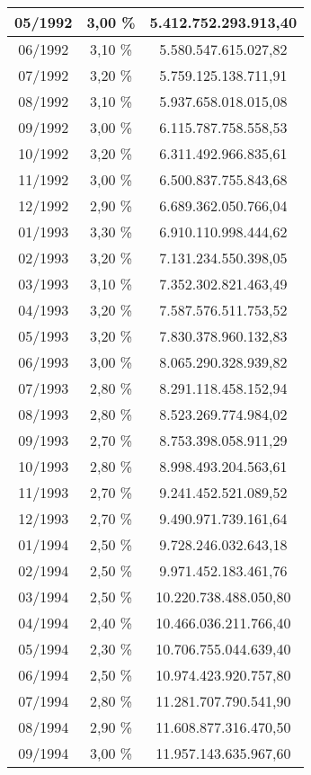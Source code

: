 \begin{center}
\begin{longtable}{|c|c|c|}
05/1992 & 3,00 \% & 5.412.752.293.913,40 \\ \hline
06/1992 & 3,10 \% & 5.580.547.615.027,82 \\ \hline
07/1992 & 3,20 \% & 5.759.125.138.711,91 \\ \hline
08/1992 & 3,10 \% & 5.937.658.018.015,08 \\ \hline
09/1992 & 3,00 \% & 6.115.787.758.558,53 \\ \hline
10/1992 & 3,20 \% & 6.311.492.966.835,61 \\ \hline
11/1992 & 3,00 \% & 6.500.837.755.843,68 \\ \hline
12/1992 & 2,90 \% & 6.689.362.050.766,04 \\ \hline
01/1993 & 3,30 \% & 6.910.110.998.444,62 \\ \hline
02/1993 & 3,20 \% & 7.131.234.550.398,05 \\ \hline
03/1993 & 3,10 \% & 7.352.302.821.463,49 \\ \hline
04/1993 & 3,20 \% & 7.587.576.511.753,52 \\ \hline
05/1993 & 3,20 \% & 7.830.378.960.132,83 \\ \hline
06/1993 & 3,00 \% & 8.065.290.328.939,82 \\ \hline
07/1993 & 2,80 \% & 8.291.118.458.152,94 \\ \hline
08/1993 & 2,80 \% & 8.523.269.774.984,02 \\ \hline
09/1993 & 2,70 \% & 8.753.398.058.911,29 \\ \hline
10/1993 & 2,80 \% & 8.998.493.204.563,61 \\ \hline
11/1993 & 2,70 \% & 9.241.452.521.089,52 \\ \hline
12/1993 & 2,70 \% & 9.490.971.739.161,64 \\ \hline
01/1994 & 2,50 \% & 9.728.246.032.643,18 \\ \hline
02/1994 & 2,50 \% & 9.971.452.183.461,76 \\ \hline
03/1994 & 2,50 \% & 10.220.738.488.050,80 \\ \hline
04/1994 & 2,40 \% & 10.466.036.211.766,40 \\ \hline
05/1994 & 2,30 \% & 10.706.755.044.639,40 \\ \hline
06/1994 & 2,50 \% & 10.974.423.920.757,80 \\ \hline
07/1994 & 2,80 \% & 11.281.707.790.541,90 \\ \hline
08/1994 & 2,90 \% & 11.608.877.316.470,50 \\ \hline
09/1994 & 3,00 \% & 11.957.143.635.967,60 \\ \hline

\end{longtable}
\end{center}
